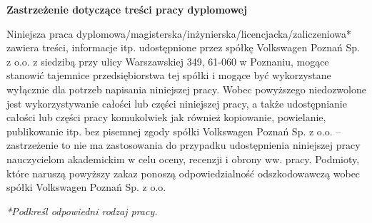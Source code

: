 \begin{center}
    \Large \textbf{Zastrzeżenie dotyczące treści pracy dyplomowej}
\end{center}

\vspace{1cm}


Niniejsza praca dyplomowa/magisterska/inżynierska/licencjacka/zaliczeniowa*
zawiera treści, informacje itp. udostępnione przez spółkę Volkswagen Poznań Sp.
z o.o.
z siedzibą przy ulicy Warszawskiej 349, 61-060 w Poznaniu, mogące stanowić
tajemnice przedsiębiorstwa tej spółki i mogące być wykorzystane wyłącznie dla
potrzeb napisania niniejszej pracy. Wobec powyższego niedozwolone jest
wykorzystywanie całości lub części niniejszej pracy, a także udostępnianie całości
lub części pracy komukolwiek jak również kopiowanie, powielanie, publikowanie itp.
bez pisemnej zgody spółki Volkswagen Poznań Sp. z o.o. – zastrzeżenie to nie ma
zastosowania do przypadku udostępnienia niniejszej pracy nauczycielom
akademickim w celu oceny, recenzji
i obrony ww. pracy. Podmioty, które naruszą powyższy zakaz ponoszą
odpowiedzialność odszkodowawczą wobec spółki Volkswagen Poznań Sp. z o.o.

\vspace{1cm}

\textit{*Podkreśl odpowiedni rodzaj pracy.}
